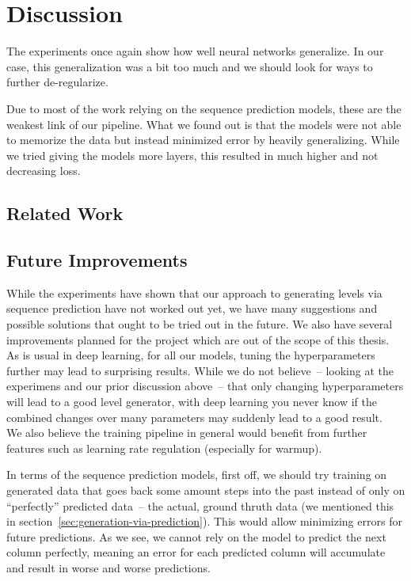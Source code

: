 \section{Discussion}

The experiments once again show how well neural networks generalize.
In our case, this generalization was a bit too much and we should look
for ways to further de-regularize.

Due to most of the work relying on the sequence prediction models,
these are the weakest link of our pipeline. What we found out is that
the models were not able to memorize the data but instead minimized
error by heavily generalizing. While we tried giving the models more
layers, this resulted in much higher and not decreasing loss.

\subsection{Related Work}



\subsection{Future Improvements}

While the experiments have shown that our approach to generating
levels via sequence prediction have not worked out yet, we have many
suggestions and possible solutions that ought to be tried out in the
future. We also have several improvements planned for the project
which are out of the scope of this thesis. \\
As is usual in deep learning, for all our models, tuning the
hyperparameters further may lead to surprising results. While we do
not believe~-- looking at the experimens and our prior discussion
above~-- that only changing hyperparameters will lead to a good level
generator, with deep learning you never know if the combined changes
over many parameters may suddenly lead to a good result. \\
We also believe the training pipeline in general would benefit from
further features such as learning rate regulation (especially for
warmup).

In terms of the sequence prediction models, first off, we should try
training on generated data that goes back some amount steps into the
past instead of only on ``perfectly'' predicted data~-- the actual,
ground thruth data (we mentioned this in
section~\ref{sec:generation-via-prediction}). This would allow
minimizing errors for future predictions. As we see, we cannot rely on
the model to predict the next column perfectly, meaning an error for
each predicted column will accumulate and result in worse and worse
predictions.

